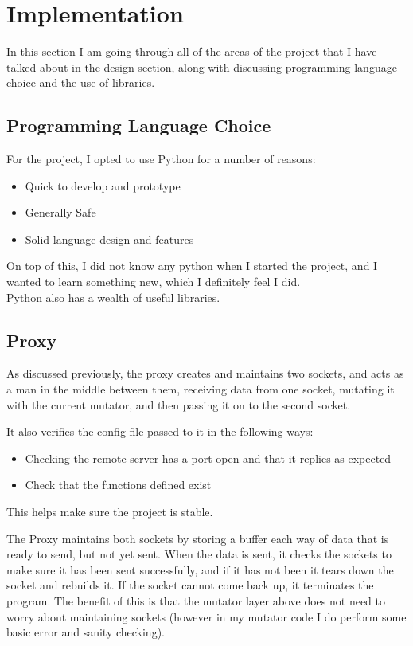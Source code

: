 \section{Implementation}
In this section I am going through all of the areas of the project that I have talked about in the design section, along with discussing programming language choice and the use of libraries.

\subsection{Programming Language Choice}
For the project, I opted to use Python for a number of reasons:
\begin{itemize}
    \item Quick to develop and prototype
    \item Generally Safe
    \item Solid language design and features
\end{itemize}

On top of this, I did not know any python when I started the project, and I wanted to learn something new, which I definitely feel I did.\\
Python also has a wealth of useful libraries.

\subsection{Proxy}
As discussed previously, the proxy creates and maintains two sockets, and acts as a man in the middle between them, receiving data from one socket, mutating it with the current mutator, and then passing it on to the second socket.\par

It also verifies the config file passed to it in the following ways:
\begin{itemize}
    \item Checking the remote server has a port open and that it replies as expected
    \item Check that the functions defined exist
\end{itemize}
This helps make sure the project is stable.\par

The Proxy maintains both sockets by storing a buffer each way of data that is ready to send, but not yet sent. When the data is sent, it checks the sockets to make sure it has been sent successfully, and if it has not been it tears down the socket and rebuilds it. If the socket cannot come back up, it terminates the program.
The benefit of this is that the mutator layer above does not need to worry about maintaining sockets (however in my mutator code I do perform some basic error and sanity checking).

